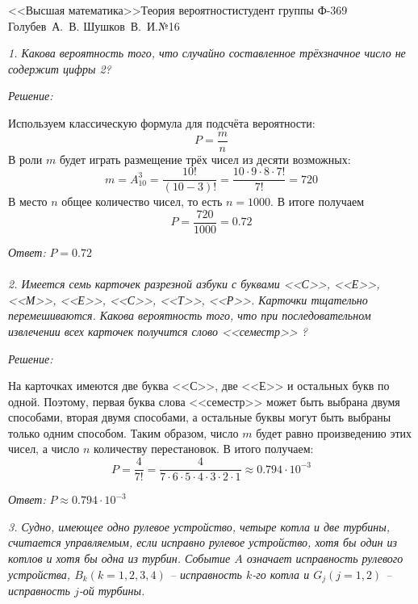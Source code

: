 






{<<Высшая математика>>}{Теория вероятности}{студент группы Ф-369\\Голубев~А.~В.}
{Шушков~В.~И.}{№1}{6}

\newpage

\emph{1. Какова вероятность того, что случайно составленное трёхзначное число 
не содержит цифры 2? }

\emph{Решение:}

Используем классическую формула для подсчёта вероятности:
\[ P = \frac{m}{n} \]
В роли \( m \) будет играть размещение трёх чисел из десяти возможных:
\[ 
	m = A^{3}_{10} = \frac{10!}{(10-3)!} = 
	\frac{10\cdot9\cdot8\cdot7!}{7!} = 720 
\]
В место \( n \) общее количество чисел, то есть \( n = 1000 \). В итоге 
получаем
\[ P = \frac{720}{1000} = 0.72 \]

\emph{Ответ: } \( P = 0.72 \) \\\\


\emph{2. Имеется семь карточек разрезной азбуки с буквами <<С>>, <<Е>>, <<М>>, 
<<Е>>, <<С>>, <<Т>>, <<Р>>. Карточки тщательно перемешиваются. Какова 
вероятность того, что при последовательном извлечении всех карточек 
получится слово <<семестр>> ?}

\emph{Решение:}

На карточках имеются две буква <<С>>, две <<Е>> и остальных букв по одной. 
Поэтому, первая буква слова <<семестр>> может быть выбрана двумя способами, 
вторая двумя способами, а остальные буквы могут быть выбраны только одним 
способом. Таким образом, число \( m \) будет равно произведению этих чисел, 
а число \( n \) количеству перестановок. В итого получаем:
\[ 	
	P = \frac{ 4 }{ 7! } 
	= \frac{ 4 }{ 7\cdot6\cdot5\cdot4\cdot3\cdot2\cdot1 }
	\approx 0.794\cdot10^{-3}
\]

\emph{Ответ: } \( P \approx 0.794\cdot10^{-3} \) 

\newpage


\emph{3. Судно, имеющее одно рулевое устройство, четыре котла и две турбины, 
считается управляемым, если исправно рулевое устройство, хотя бы один из 
котлов и хотя бы одна из турбин. Событие \( A \) означает исправность 
рулевого устройства, \( B_k (k = 1, 2, 3, 4) \) -- исправность \( k \)-го 
котла и \( G_j (j = 1, 2) \) -- исправность \( j \)-ой турбины.}

